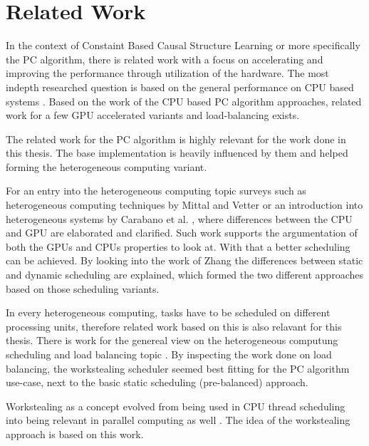 \chapter{Related Work}
In the context of Constaint Based Causal Structure Learning or more specifically the PC algorithm, there is related work with a focus on accelerating and improving the performance through utilization of the hardware. The most indepth researched question is based on the general performance on CPU based systems \cite{leFastPCAlgorithm2019, leParallelPCPackageEfficient2015, schmidtLoadBalancedParallelConstraintBased2019, colomboOrderIndependentConstraintBasedCausal,kalischEstimatingHighDimensionalDirected2007,scutariBayesianNetworkConstraintBased2017}. Based on the work of the CPU based PC algorithm approaches, related work for a few GPU accelerated variants \cite{schmidtOrderIndependentConstraintBasedCausal2018,zarebavaniCuPCCUDAbasedParallel2018} and load-balancing \cite{schmidtLoadBalancedParallelConstraintBased2019} exists.

The related work for the PC algorithm is highly relevant for the work done in this thesis. The base implementation is heavily influenced by them and helped forming the heterogeneous computing variant.

For an entry into the heterogeneous computing topic surveys such as heterogeneous computing techniques by Mittal and Vetter \cite{mittalSurveyCPUGPUHeterogeneous2015} or an introduction into heterogeneous systems by Carabano et al. \cite{carabanoExplorationHeterogeneousSystems2013}, where differences between the CPU and GPU are elaborated and clarified. Such work supports the argumentation of both the GPUs and CPUs properties to look at. With that a better scheduling can be achieved. By looking into the work of Zhang \cite{zhangDynamicStaticLoad1991} the differences between static and dynamic scheduling are explained, which formed the two different approaches based on those scheduling variants.

In every heterogeneous computing, tasks have to be scheduled on different processing units, therefore related work based on this is also relavant for this thesis. There is work for the genereal view on the heterogeneous computung scheduling and load balancing topic \cite{abdelkaderDynamicTaskScheduling2012,binottoDynamicReconfigurableLoadbalancing2010,galindoDynamicLoadBalancing2008,kopetzRealTimeScheduling1997,kwokStaticSchedulingAlgorithms1999,momcilovicDynamicLoadBalancing2014,singhSurveyStaticScheduling2015}. By inspecting the work done on load balancing, the workstealing scheduler seemed best fitting for the PC algorithm use-case, next to the basic static scheduling (pre-balanced) approach.

Workstealing as a concept evolved from being used in CPU thread scheduling \cite{blumofeSchedulingMultithreadedComputations1999} into being relevant in parallel computing as well \cite{letzWorkStealingScheduler2010,mattheisWorkStealingStrategies2012,prellEmbracingExplicitCommunication2016}. The idea of the workstealing approach is based on this work.

